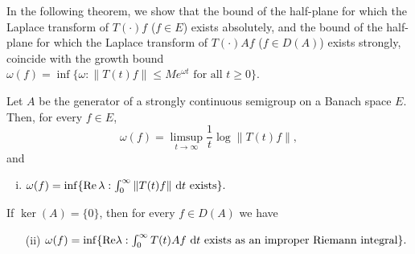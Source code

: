 

In the following theorem, we show that the bound of the half-plane for which the Laplace transform of $T(\cdot)f$ ($f \in E$) exists absolutely, and the bound of the half-plane for which the Laplace transform of $T(\cdot)Af$ ($f \in D(A)$) exists strongly, coincide with the growth bound $\omega(f) = \inf\{\omega : \|T(t)f\| \leq Me^{\omega t} \text{ for all } t \geq 0\}$.



\begin{theorem}\label{thm:a4-1.3}
Let $A$ be the generator of a strongly continuous semigroup on a Banach space $E$. 
Then, for every $f \in E$,
\begin{equation}\label{eq:a4-1.2}
\omega(f) = \limsup_{t \to \infty} \frac{1}{t}\log\|T(t)f\|,
\end{equation}
and
\begin{enumerate}[(i)]
\item $\omega(f) = \inf\{\mathop{}\!\mathrm{Re}\,\lambda : \int_{0}^{\infty} \|T(t)f\| \,\mathop{}\!\mathrm{d}{t} \text{ exists}\}.$
\end{enumerate}
If $\ker(A) = \{0\}$, then for every $f \in D(A)$ we have 
\begin{enumerate}
\item[(ii)] $\omega(f) = \inf\{\mathop{}\!\mathrm{Re}\lambda : \int_{0}^{\infty} T(t)Af \,\mathop{}\!\mathrm{d}{t} \text{ exists as an improper Riemann integral}\}.$
\end{enumerate}
\end{theorem}
